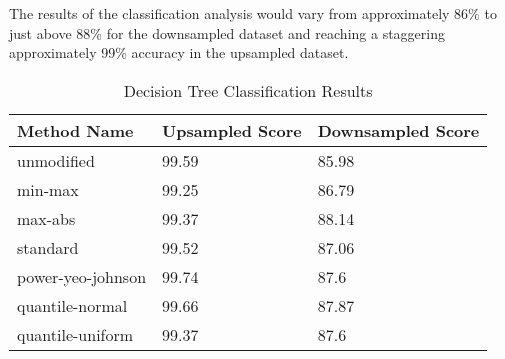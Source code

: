 The results of the classification analysis would vary from approximately 86\% to just above 88\% for the downsampled dataset and reaching a staggering approximately 99\% accuracy in the upsampled dataset.
\begin{table}[h!]
\centering
\caption{Decision Tree Classification Results}
\label{tbl:results:decision-tree}
\begin{tabular}{@{}lll@{}}
\toprule
Method Name & Upsampled Score & Downsampled Score \\ \midrule
unmodified & 99.59 & 85.98 \\
min-max & 99.25 & 86.79 \\
max-abs & 99.37 & 88.14 \\
standard & 99.52 & 87.06 \\
power-yeo-johnson & 99.74 & 87.6 \\
quantile-normal & 99.66 & 87.87 \\
quantile-uniform & 99.37 & 87.6 \\ \bottomrule
\end{tabular}
\end{table}

